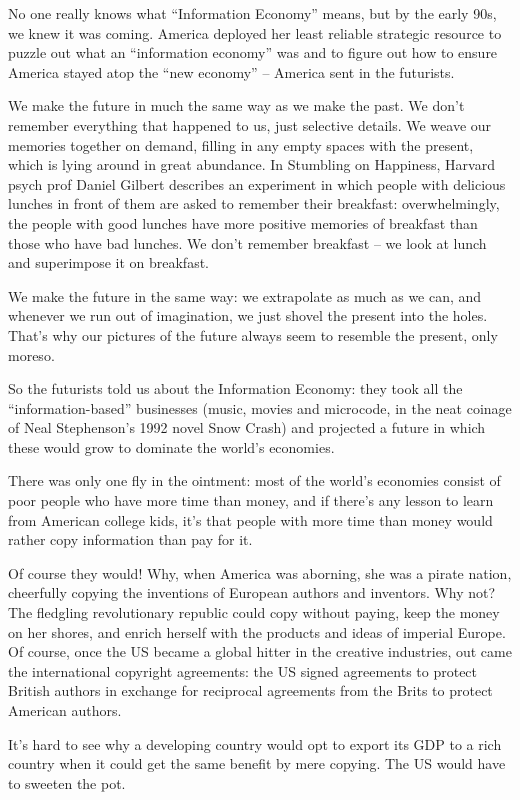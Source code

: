 No one really knows what ``Information Economy'' means, but by the
early 90s, we knew it was coming. America deployed her least
reliable strategic resource to puzzle out what an ``information
economy'' was and to figure out how to ensure America stayed atop
the ``new economy'' -- America sent in the futurists.

We make the future in much the same way as we make the past. We
don't remember everything that happened to us, just selective
details. We weave our memories together on demand, filling in any
empty spaces with the present, which is lying around in great
abundance. In Stumbling on Happiness, Harvard psych prof Daniel
Gilbert describes an experiment in which people with delicious
lunches in front of them are asked to remember their breakfast:
overwhelmingly, the people with good lunches have more positive
memories of breakfast than those who have bad lunches. We don't
remember breakfast -- we look at lunch and superimpose it on
breakfast.

We make the future in the same way: we extrapolate as much as we
can, and whenever we run out of imagination, we just shovel the
present into the holes. That's why our pictures of the future
always seem to resemble the present, only moreso.

So the futurists told us about the Information Economy: they took
all the ``information-based'' businesses (music, movies and
microcode, in the neat coinage of Neal Stephenson's 1992 novel Snow
Crash) and projected a future in which these would grow to dominate
the world's economies.

There was only one fly in the ointment: most of the world's
economies consist of poor people who have more time than money, and
if there's any lesson to learn from American college kids, it's
that people with more time than money would rather copy information
than pay for it.

Of course they would! Why, when America was aborning, she was a
pirate nation, cheerfully copying the inventions of European
authors and inventors. Why not? The fledgling revolutionary
republic could copy without paying, keep the money on her shores,
and enrich herself with the products and ideas of imperial Europe.
Of course, once the US became a global hitter in the creative
industries, out came the international copyright agreements: the US
signed agreements to protect British authors in exchange for
reciprocal agreements from the Brits to protect American authors.

It's hard to see why a developing country would opt to export its
GDP to a rich country when it could get the same benefit by mere
copying. The US would have to sweeten the pot.

